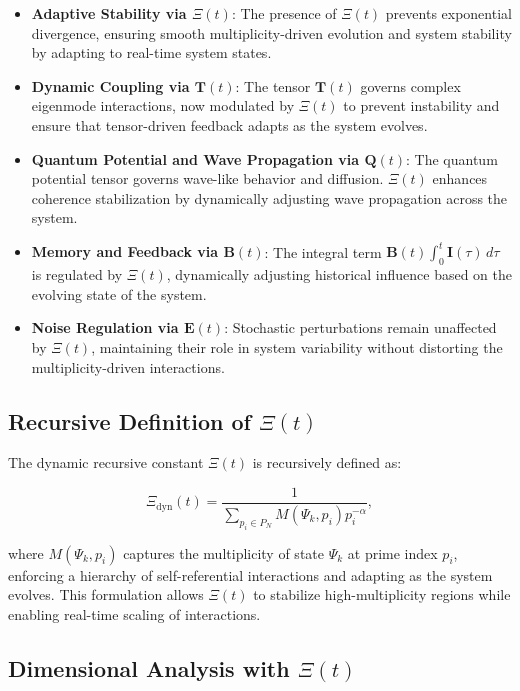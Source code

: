 \documentclass{article}
\theoremstyle{plain}
\begin{document}
\begin{itemize}
\begin{itemize}
    \item \textbf{Adaptive Stability via \(\Xi(t) \)}: The presence of \(\Xi(t) \) prevents exponential divergence, ensuring smooth multiplicity-driven evolution and system stability by adapting to real-time system states.
    \item \textbf{Dynamic Coupling via \( \bm{T}(t) \)}: The tensor \( \bm{T}(t) \) governs complex eigenmode interactions, now modulated by \(\Xi(t) \) to prevent instability and ensure that tensor-driven feedback adapts as the system evolves.
    \item \textbf{Quantum Potential and Wave Propagation via \( \bm{Q}(t) \)}: The quantum potential tensor governs wave-like behavior and diffusion. \(\Xi(t) \) enhances coherence stabilization by dynamically adjusting wave propagation across the system.
    \item \textbf{Memory and Feedback via \( \bm{B}(t) \)}: The integral term \( \bm{B}(t) \int_0^t \bm{I}(\tau) \, d\tau \) is regulated by \(\Xi(t) \), dynamically adjusting historical influence based on the evolving state of the system.
    \item \textbf{Noise Regulation via \( \bm{E}(t) \)}: Stochastic perturbations remain unaffected by \(\Xi(t) \), maintaining their role in system variability without distorting the multiplicity-driven interactions.
\end{itemize}

\subsection{Recursive Definition of \(\Xi(t) \)}

The dynamic recursive constant \(\Xi(t) \) is recursively defined as:

\begin{equation}
\Xi_{\text{dyn}}(t) = \frac{1}{\sum_{p_i \in P_N} M(\Psi_k, p_i) p_i^{-\alpha}},
\end{equation}

where \( M(\Psi_k, p_i) \) captures the multiplicity of state \( \Psi_k \) at prime index \( p_i \), enforcing a hierarchy of self-referential interactions and adapting as the system evolves. This formulation allows \(\Xi(t) \) to stabilize high-multiplicity regions while enabling real-time scaling of interactions.

\subsection{Dimensional Analysis with \(\Xi(t) \)}


\end{itemize}
\end{document}
